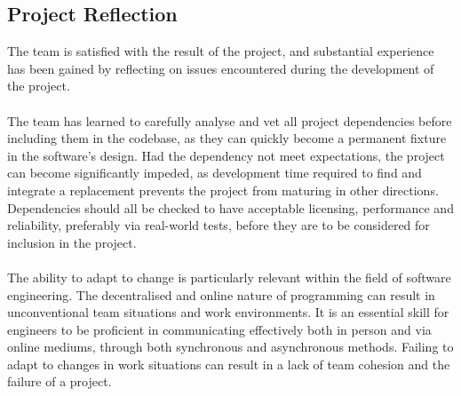 \documentclass{article}
\begin{document}
\subsection{Project Reflection}
The team is satisfied with the result of the project, and substantial
experience has been gained by reflecting on issues encountered during the
development of the project.\\\\
The team has learned to carefully analyse and vet all project dependencies
before including them in the codebase, as they can quickly become a permanent
fixture in the software's design. Had the dependency not meet expectations,
the project can become significantly impeded, as development time required
to find and integrate a replacement prevents the project from maturing in
other directions. Dependencies should all be checked to have acceptable
licensing, performance and reliability, preferably via real-world tests, before
they are to be considered for inclusion in the project.\\\\
The ability to adapt to change is particularly relevant within the field of
software engineering. The decentralised and online nature of programming can
result in unconventional team situations and work environments.
It is an essential skill for engineers to be proficient in communicating
effectively both in person and via online mediums, through both synchronous and
asynchronous methods. Failing to adapt to changes in work situations can result
in a lack of team cohesion and the failure of a project.
\end{document}
